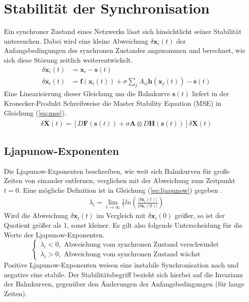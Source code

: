\section{Stabilität der Synchronisation}
Ein synchroner Zustand eines Netzwerks lässt sich hinsichtlicht seiner Stabilität untersuchen. Dabei wird eine kleine Abweichung $\delta\boldsymbol{x}_i(t)$ der Anfangsbedingungen des synchronen Zustandes angenommen und berechnet, wie sich diese Störung zeitlich weiterentwickelt.
\begin{align}\label{eq:deltaxi}
\delta \boldsymbol{x}_i(t) &= \boldsymbol{x}_i - \boldsymbol{s}(t)\\
\delta \overset{\cdot}{\boldsymbol{x}}_i(t) &= \boldsymbol{f}(\boldsymbol{x}_i(t))+\sigma\sum_j A_{ij}\boldsymbol{h}\left(\boldsymbol{x}_j(t)\right) - \overset{\cdot}{\boldsymbol{s}}(t)
\end{align}
Eine Linearisierung dieser Gleichung um die Bahnkurve $\boldsymbol{s}(t)$ liefert in der Kronecker-Produkt Schreibweise die Master Stability Equation (MSE) in Gleichung (\ref*{eq:mse}).
\begin{align}\label{eq:mse}
\delta\overset{\cdot}{\boldsymbol{X}}(t)=
\left[D\boldsymbol{F}(\boldsymbol{s}(t))+\sigma\boldsymbol{A}\otimes D\boldsymbol{H}(\boldsymbol{s}(t))\right]\delta\boldsymbol{X}(t)
\end{align}

\subsection*{Ljapunow-Exponenten}
Die Ljapunow-Exponenten beschreiben, wie weit sich Bahnkurven für große Zeiten von einander entfernen, verglichen mit der Abweichung zum Zeitpunkt $t=0$. Eine mögliche Definition ist in Gleichung (\ref{eq:ljapunow}) gegeben \cite{lyapunow}.
\begin{align}\label{eq:ljapunow}
\lambda_i=\lim_{t\rightarrow\infty}\frac{1}{t} ln\left(\frac{|\delta \boldsymbol{x}_i(t)|}{|\delta \boldsymbol{x}_i(0)|}\right)
\end{align}
Wird die Abweichung $\delta\boldsymbol{x}_i(t)$ im Vergleich mit $\delta\boldsymbol{x}_i(0)$ größer, so ist der Quotient größer als 1, sonst kleiner. Es gilt also folgende Unterscheidung für die Werte der Ljapunow-Exponenten.
\begin{equation}
\begin{cases}
\lambda_i < 0, \text{ Abweichung vom synchronen Zustand verschwindet}\\
\lambda_i > 0, \text{ Abweichung vom synchronen Zustand wächst}
\end{cases}
\end{equation}
Positive Ljapunow-Exponenten weisen eine instabile Synchronisation nach und negative eine stabile. Der Stabilitätsbegriff bezieht sich hierbei auf die Invarianz der Bahnkurven, gegenüber den Änderungen der Anfangsbedingungen (für lange Zeiten). 
